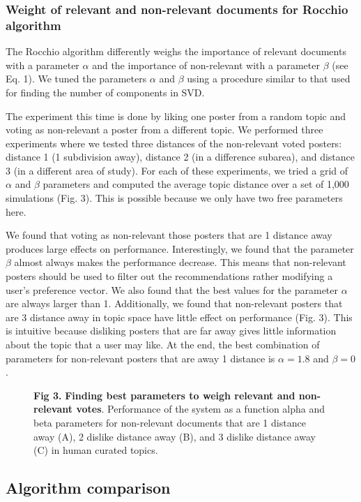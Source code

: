 \documentclass[a4paper]{article}
\begin{document}
\subsubsection*{Weight of relevant and non-relevant documents for Rocchio algorithm}

The Rocchio algorithm differently weighs the importance of relevant documents with a parameter $\alpha$ and the importance of non-relevant with a parameter $\beta$ (see  Eq. 1). We tuned the parameters $\alpha$ and $\beta$ using a procedure similar to that used for finding the number of components in SVD.

The experiment this time is done by liking one poster from a random topic and voting as non-relevant a poster from a different topic. We performed three experiments where we tested three distances of the non-relevant voted posters: distance 1 (1 subdivision away), distance 2 (in a difference subarea), and distance 3 (in a different area of study). For each of these experiments, we tried a grid of $\alpha$ and $\beta$ parameters and computed the average topic distance over a set of 1,000 simulations (Fig. 3). This is possible because we only have two free parameters here.

We found that voting as non-relevant those posters that are 1 distance away produces large effects on performance. Interestingly, we found that the parameter $\beta$ almost always makes the performance decrease. This means that non-relevant posters should be used to filter out the recommendations rather modifying a user’s preference vector. We also found that the best values for the parameter $\alpha$ are always larger than 1. Additionally, we found that non-relevant posters that are 3 distance away in topic space have little effect on performance (Fig. 3). This is intuitive because disliking posters that are far away gives little information about the topic that a user may like. At the end, the best combination of parameters for non-relevant posters that are away 1 distance is $\alpha=1.8$ and $\beta=0$.


\begin{figure}[!ht]
\textbf{Fig 3.} \textbf{Finding best parameters to weigh relevant and non-relevant votes}. Performance of the system as a function alpha and beta parameters for non-relevant documents that are 1 distance away (A), 2 dislike distance away (B), and 3 dislike distance away (C) in human curated topics.
\end{figure}

\subsection{Algorithm comparison}
\end{document}
